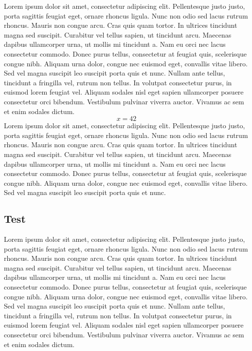 \documentclass[letterpaper, twoside, 12pt, memoire, creativecommons, hyperref]{thETS}
\begin{document}
Lorem ipsum dolor sit amet, consectetur adipiscing elit. Pellentesque justo justo, porta sagittis feugiat eget, ornare rhoncus ligula. Nunc non odio sed lacus rutrum rhoncus. Mauris non congue arcu. Cras quis quam tortor. In ultrices tincidunt magna sed suscipit. Curabitur vel tellus sapien, ut tincidunt arcu. Maecenas dapibus ullamcorper urna, ut mollis mi tincidunt a. Nam eu orci nec lacus consectetur commodo. Donec purus tellus, consectetur at feugiat quis, scelerisque congue nibh. Aliquam urna dolor, congue nec euismod eget, convallis vitae libero. Sed vel magna suscipit leo suscipit porta quis et nunc. Nullam ante tellus, tincidunt a fringilla vel, rutrum non tellus. In volutpat consectetur purus, in euismod lorem feugiat vel. Aliquam sodales nisl eget sapien ullamcorper posuere consectetur orci bibendum. Vestibulum pulvinar viverra auctor. Vivamus ac sem et enim sodales dictum.
\begin{equation}
x = 42
\end{equation} 
Lorem ipsum dolor sit amet, consectetur adipiscing elit. Pellentesque justo justo, porta sagittis feugiat eget, ornare rhoncus ligula. Nunc non odio sed lacus rutrum rhoncus. Mauris non congue arcu. Cras quis quam tortor. In ultrices tincidunt magna sed suscipit. Curabitur vel tellus sapien, ut tincidunt arcu. Maecenas dapibus ullamcorper urna, ut mollis mi tincidunt a. Nam eu orci nec lacus consectetur commodo. Donec purus tellus, consectetur at feugiat quis, scelerisque congue nibh. Aliquam urna dolor, congue nec euismod eget, convallis vitae libero. Sed vel magna suscipit leo suscipit porta quis et nunc.

\subsection{Test}


Lorem ipsum dolor sit amet, consectetur adipiscing elit. Pellentesque justo justo, porta sagittis feugiat eget, ornare rhoncus ligula. Nunc non odio sed lacus rutrum rhoncus. Mauris non congue arcu. Cras quis quam tortor. In ultrices tincidunt magna sed suscipit. Curabitur vel tellus sapien, ut tincidunt arcu. Maecenas dapibus ullamcorper urna, ut mollis mi tincidunt a. Nam eu orci nec lacus consectetur commodo. Donec purus tellus, consectetur at feugiat quis, scelerisque congue nibh. Aliquam urna dolor, congue nec euismod eget, convallis vitae libero. Sed vel magna suscipit leo suscipit porta quis et nunc. Nullam ante tellus, tincidunt a fringilla vel, rutrum non tellus. In volutpat consectetur purus, in euismod lorem feugiat vel. Aliquam sodales nisl eget sapien ullamcorper posuere consectetur orci bibendum. Vestibulum pulvinar viverra auctor. Vivamus ac sem et enim sodales dictum.
\end{document}
